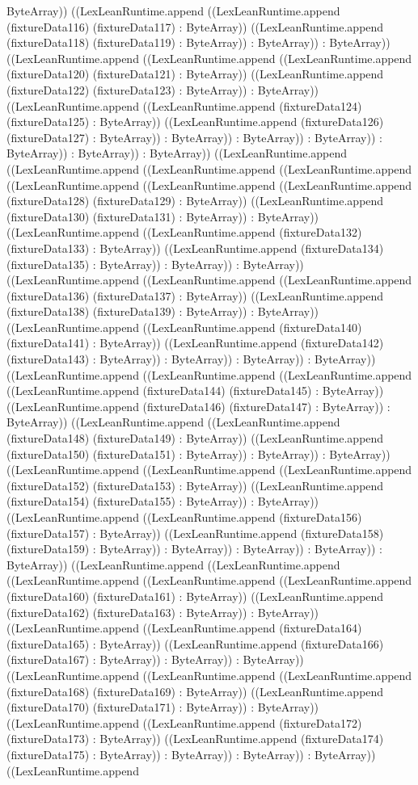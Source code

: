 \documentclass[11pt]{article}
\begin{document}
ByteArray)) ((LexLeanRuntime.append ((LexLeanRuntime.append (fixtureData116) (fixtureData117) : ByteArray)) ((LexLeanRuntime.append (fixtureData118) (fixtureData119) : ByteArray)) : ByteArray)) : ByteArray)) ((LexLeanRuntime.append ((LexLeanRuntime.append ((LexLeanRuntime.append (fixtureData120) (fixtureData121) : ByteArray)) ((LexLeanRuntime.append (fixtureData122) (fixtureData123) : ByteArray)) : ByteArray)) ((LexLeanRuntime.append ((LexLeanRuntime.append (fixtureData124) (fixtureData125) : ByteArray)) ((LexLeanRuntime.append (fixtureData126) (fixtureData127) : ByteArray)) : ByteArray)) : ByteArray)) : ByteArray)) : ByteArray)) : ByteArray)) : ByteArray)) ((LexLeanRuntime.append ((LexLeanRuntime.append ((LexLeanRuntime.append ((LexLeanRuntime.append ((LexLeanRuntime.append ((LexLeanRuntime.append ((LexLeanRuntime.append (fixtureData128) (fixtureData129) : ByteArray)) ((LexLeanRuntime.append (fixtureData130) (fixtureData131) : ByteArray)) : ByteArray)) ((LexLeanRuntime.append ((LexLeanRuntime.append (fixtureData132) (fixtureData133) : ByteArray)) ((LexLeanRuntime.append (fixtureData134) (fixtureData135) : ByteArray)) : ByteArray)) : ByteArray)) ((LexLeanRuntime.append ((LexLeanRuntime.append ((LexLeanRuntime.append (fixtureData136) (fixtureData137) : ByteArray)) ((LexLeanRuntime.append (fixtureData138) (fixtureData139) : ByteArray)) : ByteArray)) ((LexLeanRuntime.append ((LexLeanRuntime.append (fixtureData140) (fixtureData141) : ByteArray)) ((LexLeanRuntime.append (fixtureData142) (fixtureData143) : ByteArray)) : ByteArray)) : ByteArray)) : ByteArray)) ((LexLeanRuntime.append ((LexLeanRuntime.append ((LexLeanRuntime.append ((LexLeanRuntime.append (fixtureData144) (fixtureData145) : ByteArray)) ((LexLeanRuntime.append (fixtureData146) (fixtureData147) : ByteArray)) : ByteArray)) ((LexLeanRuntime.append ((LexLeanRuntime.append (fixtureData148) (fixtureData149) : ByteArray)) ((LexLeanRuntime.append (fixtureData150) (fixtureData151) : ByteArray)) : ByteArray)) : ByteArray)) ((LexLeanRuntime.append ((LexLeanRuntime.append ((LexLeanRuntime.append (fixtureData152) (fixtureData153) : ByteArray)) ((LexLeanRuntime.append (fixtureData154) (fixtureData155) : ByteArray)) : ByteArray)) ((LexLeanRuntime.append ((LexLeanRuntime.append (fixtureData156) (fixtureData157) : ByteArray)) ((LexLeanRuntime.append (fixtureData158) (fixtureData159) : ByteArray)) : ByteArray)) : ByteArray)) : ByteArray)) : ByteArray)) ((LexLeanRuntime.append ((LexLeanRuntime.append ((LexLeanRuntime.append ((LexLeanRuntime.append ((LexLeanRuntime.append (fixtureData160) (fixtureData161) : ByteArray)) ((LexLeanRuntime.append (fixtureData162) (fixtureData163) : ByteArray)) : ByteArray)) ((LexLeanRuntime.append ((LexLeanRuntime.append (fixtureData164) (fixtureData165) : ByteArray)) ((LexLeanRuntime.append (fixtureData166) (fixtureData167) : ByteArray)) : ByteArray)) : ByteArray)) ((LexLeanRuntime.append ((LexLeanRuntime.append ((LexLeanRuntime.append (fixtureData168) (fixtureData169) : ByteArray)) ((LexLeanRuntime.append (fixtureData170) (fixtureData171) : ByteArray)) : ByteArray)) ((LexLeanRuntime.append ((LexLeanRuntime.append (fixtureData172) (fixtureData173) : ByteArray)) ((LexLeanRuntime.append (fixtureData174) (fixtureData175) : ByteArray)) : ByteArray)) : ByteArray)) : ByteArray)) ((LexLeanRuntime.append 
\end{document}
